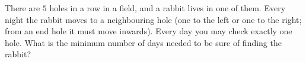 There are $5$ holes in a row in a field, and a rabbit lives in one of them. Every night the rabbit moves to a neighbouring hole (one to the left or one to the right; from an end hole it must move inwards). Every day you may check exactly one hole. What is the minimum number of days needed to be sure of finding the rabbit?
